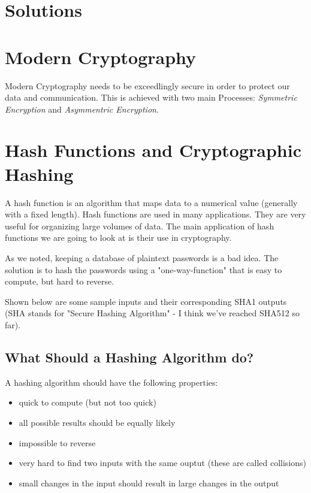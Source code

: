 \documentclass[11pt,a4paper]{report}
\begin{document}
\section{Solutions}

\printcursols

\newpage

\section{Modern Cryptography}

Modern Cryptography needs to be exceedlingly secure in order to protect our data and communication. This is achieved with two main Processes: \emph{Symmetric Encryption} and \emph{Asymmentric Encryption}. 



\newpage
\section{Hash Functions and Cryptographic Hashing}

A hash function is an algorithm that maps data to a numerical value (generally with a fixed length). Hash functions are used in many applications. They are very useful for organizing large volumes of data. The main application of hash functions we are going to look at is their use in cryptography.

As we noted, keeping a database of plaintext passwords is a bad idea. The solution is to hash the passwords using a "one-way-function" that is easy to compute, but hard to reverse. 

Shown below are some sample inputs and their corresponding SHA1 outputs (SHA stands for "Secure Hashing Algorithm" - I think we've reached SHA512 so far).


\subsection{What Should a Hashing Algorithm do?}

A hashing algorithm should have the following properties:
\begin{itemize}
\item quick to compute (but not too quick)
\item all possible results should be equally likely
\item impossible	 to reverse
\item very hard to find two inputs with the same ouptut (these are called collisions)
\item small changes in the input should result in large changes in the output
\end{itemize}
\end{document}
